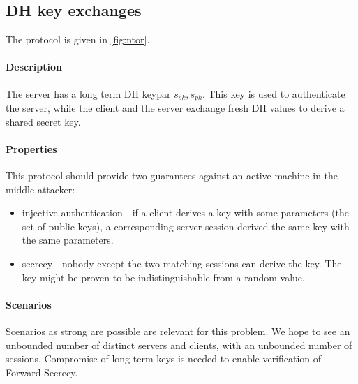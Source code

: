 \documentclass{article}
\newcommand{\sfsk}{\mathit{sk}}
\newcommand{\sfpk}{\mathit{pk}}
\begin{document}
\subsection{DH key exchanges}\label{prob:ntor}

The protocol is given in \cref{fig:ntor}.

 \paragraph{Description}The server has a long term DH keypar $s_\sfsk,s_\sfpk$.
This key is used to authenticate the server, while the client and the server exchange fresh DH values to derive a shared secret key. 

\paragraph{Properties} This protocol should provide two guarantees against an active machine-in-the-middle attacker:
\begin{itemize}
\item injective authentication - if a client derives a key with some parameters (the set of public keys), a corresponding server session derived the same key with the same parameters.
\item secrecy - nobody except the two matching sessions can derive the key.  The key might be proven to be indistinguishable from a random value.
\end{itemize}

\paragraph{Scenarios} Scenarios as strong are possible are relevant for this problem. We hope to see an unbounded number of distinct servers and clients, with an unbounded number of sessions. Compromise of long-term keys is needed to enable verification of Forward Secrecy.  
\end{document}
